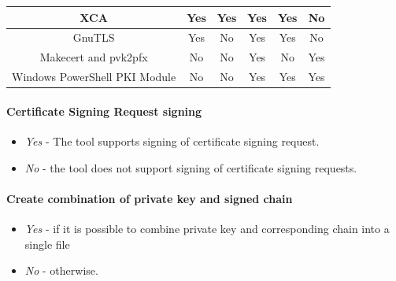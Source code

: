 \documentclass[10pt, a4paper]{report}
\begin{document}
\begin{table}[h!]
\begin{adjustbox}{max width=\textwidth}
\begin{tabular}{|c|c|c|c|c|c|}
XCA                           & \cellcolor[HTML]{34FF34}Yes   & \cellcolor[HTML]{34FF34}Yes              & \cellcolor[HTML]{34FF34}Yes                    & \cellcolor[HTML]{34FF34}Yes                & \cellcolor[HTML]{FE0000}No                                                  \\ \hline
GnuTLS                        & \cellcolor[HTML]{34FF34}Yes   & \cellcolor[HTML]{FE0000}No               & \cellcolor[HTML]{34FF34}Yes                    & \cellcolor[HTML]{34FF34}Yes                & \cellcolor[HTML]{FE0000}No                                                  \\ \hline
Makecert and pvk2pfx          & \cellcolor[HTML]{FE0000}No    & \cellcolor[HTML]{FE0000}No	 	 & \cellcolor[HTML]{34FF34}Yes	               & \cellcolor[HTML]{FE0000}No                 & \cellcolor[HTML]{34FF34}Yes              		                          \\ \hline
Windows PowerShell PKI Module & \cellcolor[HTML]{FE0000}No    & \cellcolor[HTML]{FE0000}No	         & \cellcolor[HTML]{34FF34}Yes	               & \cellcolor[HTML]{34FF34}Yes	            & \cellcolor[HTML]{34FF34}Yes                                                 \\ \hline
\end{tabular}
\end{adjustbox}
\end{table}

\paragraph{Certificate Signing Request signing}

\begin{itemize}
\item \textit{Yes} - The tool supports signing of certificate signing request.
\item \textit{No} - the tool does not support signing of certificate signing requests.
\end{itemize}

\paragraph{Create combination of private key and signed chain}

\begin{itemize}
 \item \textit{Yes} - if it is possible to combine private key and corresponding chain into a single file
 \item \textit{No} - otherwise.
\end{itemize}
\end{document}
